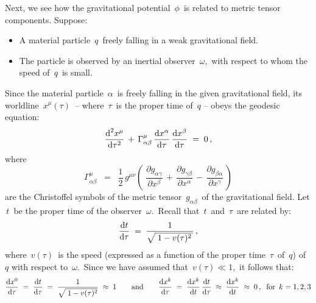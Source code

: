 
\begin{remark}
\mbox{}
\vskip -0.01cm
\noindent
Next, we see how the gravitational potential \,$\phi$\, is related to metric tensor components.
Suppose:
\begin{itemize}
\item
	A material particle \,$q$\, freely falling in a weak gravitational field.
\item
	The particle is observed by an inertial observer \,$\omega$,\,
	with respect to whom the speed of \,$q$\, is small.
\end{itemize}
Since the material particle \,$\alpha$\, is freely falling in the given gravitational field,
its worldline \,$x^{\mu}(\tau)$\, -- where \,$\tau$\, is the proper time of \,$q$ --
obeys the geodesic equation:
\begin{equation*}
\dfrac{\textnormal{d}^{2}x^{\mu}}{\textnormal{d}\tau^{2}}
\,+\,
\Gamma^{\mu}_{\alpha\beta}\,\dfrac{\textnormal{d} x^{\alpha}}{\textnormal{d}\tau}\,\dfrac{\textnormal{d} x^{\beta}}{\textnormal{d}\tau}
\; = \;
	0\,,
\end{equation*}
where
\begin{equation*}
\Gamma^{\mu}_{\alpha\beta}
\;\; = \;\;
	\dfrac{1}{2}\,g^{\mu\nu}\left(\;
		\dfrac{\partial g_{\alpha\gamma}}{\partial x^{\beta}}
		\,+\,
		\dfrac{\partial g_{\gamma\beta}}{\partial x^{\alpha}}
		\,-\,
		\dfrac{\partial g_{\beta\alpha}}{\partial x^{\gamma}}
		\,\right)
\end{equation*}
are the Christoffel symbols of the metric tensor \,$g_{\alpha\beta}$\, of the gravitational field.
Let \,$t$\, be the proper time of the observer \,$\omega$.\,
Recall that \,$t$\, and \,$\tau$\, are related by:
\begin{equation*}
\dfrac{\textnormal{d} t}{\textnormal{d}\tau} \; = \; \dfrac{1}{\sqrt{\;1 - v(\tau)^{2}\,}}\,,
\end{equation*}
where \,$v(\tau)$\, is the speed (expressed as a function of the proper time \,$\tau$\, of \,$q$) of $q$
with respect to \,$\omega$.\,
Since we have assumed that \,$v(\tau) \ll 1$,\, it follows that:
\begin{equation*}
\dfrac{\textnormal{d} x^{0}}{\textnormal{d}\tau} \; = \; \dfrac{\textnormal{d} t}{\textnormal{d}\tau} \; = \; \dfrac{1}{\sqrt{\;1 - v(\tau)^{2}}} \; \approx \; 1
\quad\quad
\textnormal{and}
\quad\quad
\dfrac{\textnormal{d} x^{k}}{\textnormal{d}\tau} \; = \; \dfrac{\textnormal{d} x^{k}}{\textnormal{d} t}\,\dfrac{\textnormal{d} t}{\textnormal{d}\tau} \; \approx \; \dfrac{\textnormal{d} x^{k}}{\textnormal{d} t} \; \approx \; 0\,,
\;\;
\textnormal{for \,$k = 1,2,3$}
\end{equation*}

\end{remark}
